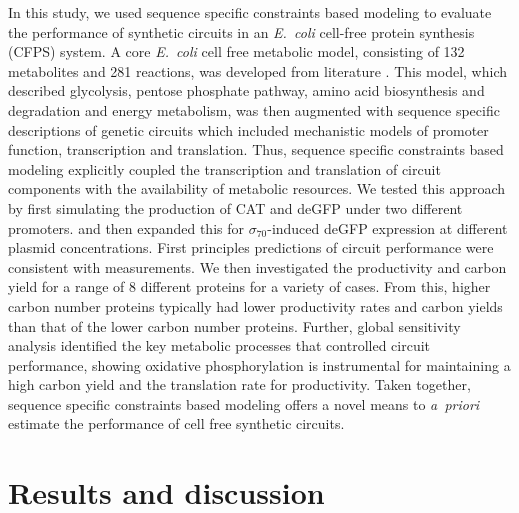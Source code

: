 \documentclass[journal=asbcd6,manuscript=article]{achemso}
\begin{document}
In this study, we used sequence specific constraints based modeling to evaluate the performance of synthetic circuits in an \emph{E.~coli} cell-free protein synthesis (CFPS) system.
A core \emph{E.~coli} cell free metabolic model, consisting of 132 metabolites and 281 reactions, was developed from literature \cite{Feist:2007aa}.
This model, which described glycolysis, pentose phosphate pathway, amino acid biosynthesis and degradation and energy metabolism, was then augmented with
sequence specific descriptions of genetic circuits which included mechanistic models of promoter function, transcription and translation.
Thus, sequence specific constraints based modeling explicitly coupled the transcription and translation of circuit components with the availability of metabolic resources.
We tested this approach by first simulating the production of CAT and deGFP under two different promoters. and then expanded this for $\sigma_{70}$-induced deGFP expression at different plasmid concentrations.
First principles predictions of circuit performance were consistent with measurements.
We then investigated the productivity and carbon yield for a range of 8 different proteins for a variety of cases.
From this, higher carbon number proteins typically had lower productivity rates and carbon yields than that of the lower carbon number proteins.
Further, global sensitivity analysis identified the key metabolic processes that controlled circuit performance, showing oxidative phosphorylation is instrumental for maintaining a high carbon yield and the translation rate for productivity.
Taken together, sequence specific constraints based modeling offers a novel means to \emph{a~priori} estimate the performance of cell free synthetic circuits.

\section{Results and discussion}
\end{document}
